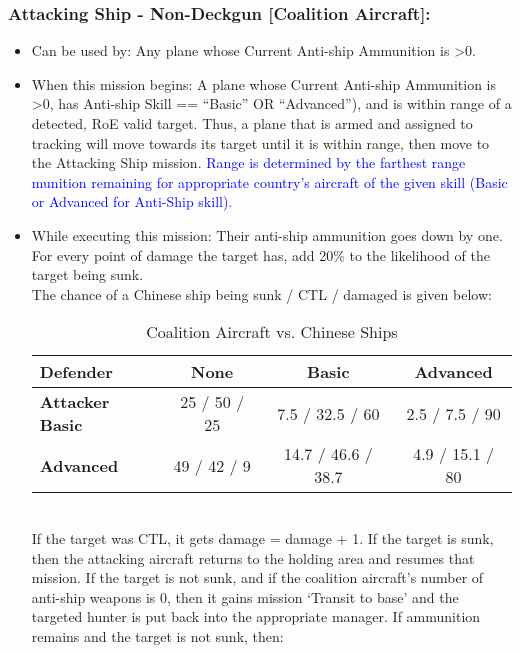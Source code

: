 \documentclass{article}
\begin{document}
    \subsubsection{Attacking Ship - Non-Deckgun [Coalition Aircraft]:}
           \begin{itemize}
                \item{Can be used by:} Any plane whose Current Anti-ship Ammunition is \textgreater 0.
                \item{When this mission begins:} A plane whose Current Anti-ship Ammunition is \textgreater 0, has Anti-ship Skill == ``Basic'' OR ``Advanced''), and is within range of a detected, RoE valid target. Thus, a plane that is armed and assigned to tracking will move towards its target until it is within range, then move to the Attacking Ship mission. \textcolor{blue}{Range is determined by the farthest range munition remaining for appropriate country's aircraft of the given skill (Basic or Advanced for Anti-Ship skill).}
                \item{While executing this mission:}
                    Their anti-ship ammunition goes down by one.\\
                    For every point of damage the target has, add 20\% to the likelihood of the target being sunk. 
                    \\ The chance of a Chinese ship being sunk / CTL / damaged is given below:\\
                    \begin{table}[h!]
                        \centering
                        \begin{tabular}{@{}lccc@{}}
                        \toprule
                        \textbf{Defender} & \textbf{None} & \textbf{Basic} & \textbf{Advanced} \\
                        \midrule
                        \textbf{Attacker} \textbf{Basic}    & 25 / 50 / 25    & 7.5 / 32.5 / 60     & 2.5 / 7.5 / 90     \\
                        \textbf{Advanced} & 49 / 42 / 9     & 14.7 / 46.6 / 38.7 & 4.9 / 15.1 / 80     \\
                        \bottomrule
                        \end{tabular}
                        \caption{Coalition Aircraft vs. Chinese Ships}
                        \label{tab:Chance of a Coalition Aircraft hitting a Chinese ship}
                        \end{table}
                    \\If the target was CTL, it gets damage = damage + 1. If the target is sunk, then the attacking aircraft returns to the holding area and resumes that mission. If the target is not sunk, and if the coalition aircraft's number of anti-ship weapons is 0, then it gains mission `Transit to base' and the targeted hunter is put back into the appropriate manager. If ammunition remains and the target is not sunk, then:

\end{itemize}
\end{document}
